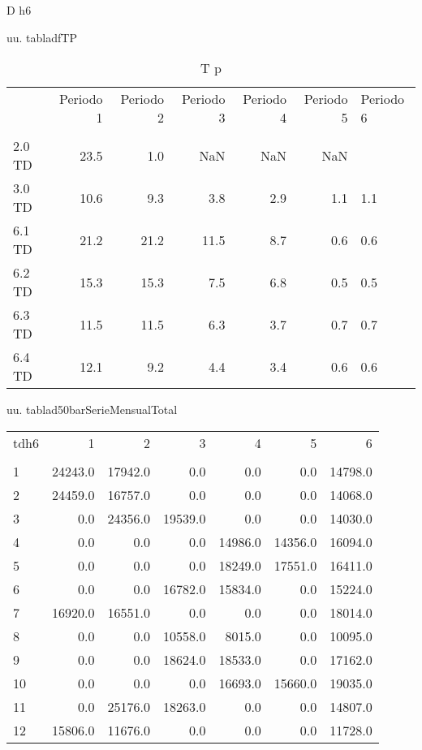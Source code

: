 \documentclass[a4paper,10pt,twocolumn]{article}
\begin{document}
\begin{Form}
\begin{table}[H]
{                        }
                        \caption{D h6}
                    \end{table}
                    

uu. tabladfTP


                    \begin{table}[H] \centering
                        {
                        \begin{tabular}{lrrrrrl}
\toprule
 & Periodo 1 & Periodo 2 & Periodo 3 & Periodo 4 & Periodo 5 & Periodo 6 \\
 &  &  &  &  &  &  \\
\midrule
2.0 TD & 23.5 & 1.0 & NaN & NaN & NaN &  \\
3.0 TD & 10.6 & 9.3 & 3.8 & 2.9 & 1.1 & 1.1 \\
6.1 TD & 21.2 & 21.2 & 11.5 & 8.7 & 0.6 & 0.6 \\
6.2 TD & 15.3 & 15.3 & 7.5 & 6.8 & 0.5 & 0.5 \\
6.3 TD & 11.5 & 11.5 & 6.3 & 3.7 & 0.7 & 0.7 \\
6.4 TD & 12.1 & 9.2 & 4.4 & 3.4 & 0.6 & 0.6 \\
\bottomrule
\end{tabular}

                        }
                        \caption{T p}
                    \end{table}
                    

uu. tablad50barSerieMensualTotal


                    \begin{table}[H] \centering
                        {
                        \begin{tabular}{lrrrrrr}
\toprule
tdh6 & 1 & 2 & 3 & 4 & 5 & 6 \\
 &  &  &  &  &  &  \\
\midrule
1 & 24243.0 & 17942.0 & 0.0 & 0.0 & 0.0 & 14798.0 \\
2 & 24459.0 & 16757.0 & 0.0 & 0.0 & 0.0 & 14068.0 \\
3 & 0.0 & 24356.0 & 19539.0 & 0.0 & 0.0 & 14030.0 \\
4 & 0.0 & 0.0 & 0.0 & 14986.0 & 14356.0 & 16094.0 \\
5 & 0.0 & 0.0 & 0.0 & 18249.0 & 17551.0 & 16411.0 \\
6 & 0.0 & 0.0 & 16782.0 & 15834.0 & 0.0 & 15224.0 \\
7 & 16920.0 & 16551.0 & 0.0 & 0.0 & 0.0 & 18014.0 \\
8 & 0.0 & 0.0 & 10558.0 & 8015.0 & 0.0 & 10095.0 \\
9 & 0.0 & 0.0 & 18624.0 & 18533.0 & 0.0 & 17162.0 \\
10 & 0.0 & 0.0 & 0.0 & 16693.0 & 15660.0 & 19035.0 \\
11 & 0.0 & 25176.0 & 18263.0 & 0.0 & 0.0 & 14807.0 \\
12 & 15806.0 & 11676.0 & 0.0 & 0.0 & 0.0 & 11728.0 \\
\bottomrule
\end{tabular}

}
\end{table}
\end{Form}
\end{document}
